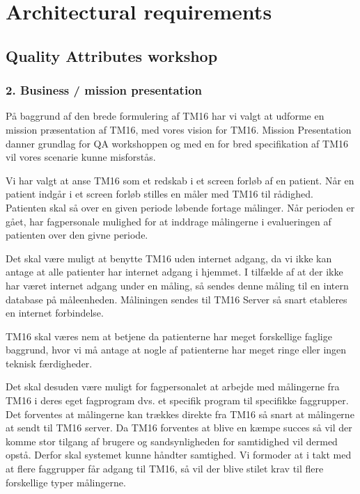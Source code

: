 \section{Architectural requirements}    
\subsection{Quality Attributes workshop}

\subsubsection{2. Business / mission presentation}

På baggrund af den brede formulering af TM16 har vi valgt at udforme en mission præsentation af TM16, med vores vision for TM16. Mission Presentation danner grundlag for QA workshoppen og med en for bred specifikation af TM16 vil vores scenarie kunne misforstås. 


Vi har valgt at anse TM16 som et redskab i et screen forløb af en patient. Når en patient indgår i et screen forløb stilles en måler med TM16 til rådighed. Patienten skal så over en given periode løbende fortage målinger. Når perioden er gået, har fagpersonale mulighed for at inddrage målingerne i evalueringen af patienten over den givne periode. 


Det skal være muligt at benytte TM16 uden internet adgang, da vi ikke kan antage at alle patienter har internet adgang i hjemmet. I tilfælde af at der ikke har været internet adgang under en måling, så sendes denne måling til en intern database på måleenheden. Måliningen sendes til TM16 Server så snart etableres en internet forbindelse.



TM16 skal væres nem at betjene da patienterne har meget forskellige faglige baggrund, hvor vi må antage at nogle af patienterne har meget ringe eller ingen teknisk færdigheder. 

Det skal desuden være muligt for fagpersonalet at arbejde med målingerne fra TM16 i deres eget fagprogram dvs. et specifik program til specifikke faggrupper. Det forventes at målingerne kan trækkes direkte fra TM16 så snart at målingerne at sendt til TM16 server. Da TM16 forventes at blive en kæmpe succes så vil der komme stor tilgang af brugere og sandsynligheden for samtidighed vil dermed opstå. Derfor skal systemet kunne håndter samtighed. Vi formoder at i takt med at flere faggrupper får adgang til TM16, så vil der blive stilet krav til flere forskellige typer målingerne.

